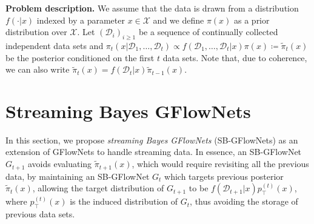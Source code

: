\documentclass{article}
\newcommand{\pp}[1]{\vspace{0pt}\noindent\textbf{#1}}
\theoremstyle{plain}
\theoremstyle{definition}
\theoremstyle{remark}
\theoremstyle{remark}
\begin{document}
\pp{Problem description.}
We assume that the data is drawn from a distribution $f(\cdot | x)$ indexed by a parameter $x \in \mathcal{X}$ and we define $\pi(x)$ as a prior distribution over $\mathcal{X}$. Let $(\mathcal{D}_{i})_{i \ge 1}$ be a sequence of continually collected independent data sets and 
$\pi_{t}(x | \mathcal{D}_{1}, \dots, \mathcal{D}_{t}) \propto f(\mathcal{D}_{1}, \dots, \mathcal{D}_{t} | x) \pi(x) \coloneq \tilde{\pi}_{t}(x)$ be the posterior conditioned on the first $t$ data sets. Note that, due to coherence, we can also write $\tilde{\pi}_{t}(x) = f(\mathcal{D}_t|x)\tilde{\pi}_{t-1}(x)$.

\section{Streaming Bayes GFlowNets} \label{sec:streaming}\label{subsec:streaming} 

In this section, we propose \emph{streaming Bayes GFlowNets} (SB-GFlowNets) as an extension of GFlowNets to handle streaming data.
% 
In essence, an SB-GFlowNet $G_{t+1}$ avoids evaluating $\tilde{\pi}_{t+1}(x)$, which would require revisiting all the previous data, by maintaining an SB-GFlowNet $G_{t}$ which targets previous posterior $\tilde{\pi}_{t}(x)$, allowing the target distribution of $G_{t+1}$ to be $f(\mathcal{D}_{t+1}|x)p^{(t)}_\intercal(x)$, where $p^{(t)}_\intercal(x)$ is the induced distribution of $G_{t}$, thus avoiding the storage of previous data sets.
% 
\end{document}
